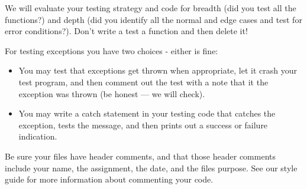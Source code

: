 \documentclass[11pt]{report}
\begin{document}
    We will evaluate your testing strategy and code for breadth (did you
    test all the functions?) and depth (did you identify all the normal and
    edge cases and test for error conditions?).  Don't write a test a
    function and then delete it!

    For testing exceptions you have two choices - either is fine:
    \begin{itemize}
        \item You may test that exceptions get thrown when appropriate, let it
          crash your test program, and then comment out the test with a
          note that it the exception was thrown (be honest --- we will
          check).
        \item You may write a catch statement in your testing code that catches
          the exception, tests the message, and then prints out a success
          or failure indication.
    \end{itemize}
    
    Be sure your files have header comments, and that those header comments
    include your name, the assignment, the date, and the files purpose. See
    our style guide for more information about commenting your code.
    
\end{document}
